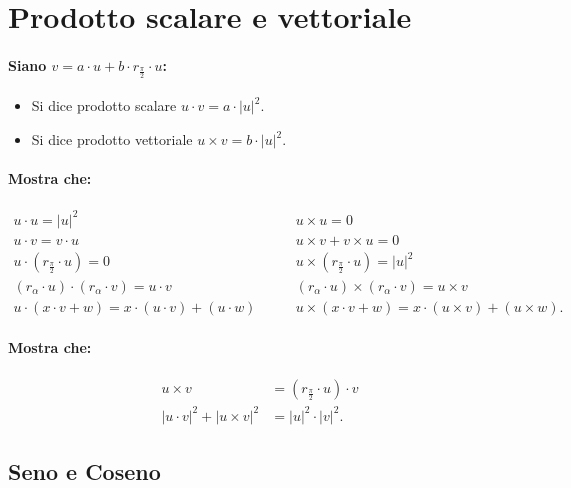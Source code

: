 \documentclass{article}
\begin{document}
\newpage
\section*{Prodotto scalare e vettoriale}

\paragraph{Siano $v = a \cdot u + b \cdot r_\frac{\pi}{2} \cdot u$:}

\begin{itemize}
\item Si dice prodotto scalare $u \cdot v = a \cdot |u|^2$.
\item Si dice prodotto vettoriale $u \times v = b \cdot |u|^2$.
\end{itemize}

\paragraph{Mostra che:}

\begin{align*}
u \cdot u = |u|^2 &\qquad u \times u = 0\\
u \cdot v = v \cdot u &\qquad u \times v + v \times u = 0\\
u \cdot (r_\frac{\pi}{2} \cdot u) = 0 &\qquad u \times (r_\frac{\pi}{2} \cdot u) = |u|^2\\
(r_\alpha \cdot u) \cdot (r_\alpha \cdot v) = u \cdot v &\qquad (r_\alpha \cdot u) \times (r_\alpha \cdot v) = u \times v\\
u \cdot (x \cdot v + w) = x \cdot (u \cdot v) + (u \cdot w) &\qquad u \times (x \cdot v + w) = x \cdot (u \times v) + (u \times w).
\end{align*}

\paragraph{Mostra che:}

\begin{align*}
u \times v &= (r_\frac{\pi}{2} \cdot u) \cdot v\\
|u \cdot v|^2 + |u \times v|^2 &= |u|^2 \cdot |v|^2.    
\end{align*}

\subsection*{Seno e Coseno}
\end{document}
